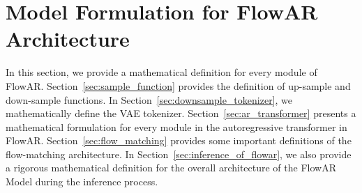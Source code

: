 
\section{Model Formulation for FlowAR Architecture}\label{sec:model_formulation_of_flowar}
In this section, we provide a mathematical definition for every module of FlowAR. 
Section~\ref{sec:sample_function} provides the definition of up-sample and down-sample functions.
In Section~\ref{sec:downsample_tokenizer}, we mathematically define the VAE tokenizer.  Section~\ref{sec:ar_transformer} presents a mathematical formulation for every module in the autoregressive transformer in FlowAR. Section~\ref{sec:flow_matching} provides some important definitions of the flow-matching architecture. In Section~\ref{sec:inference_of_flowar}, we also provide a rigorous mathematical definition for the overall architecture of the FlowAR Model during the inference process.



